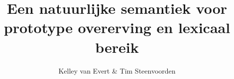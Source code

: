 \documentclass
  [11pt,a4paper,
   twoside=true,
   parskip=half,
   bibliography=totoc]
  {scrbook}
\newcommand{\<}
  {\langle}
\renewcommand{\>}
  {\rangle}
\begin{document}
\frenchspacing%
\raggedbottom%

\title{Een natuurlijke semantiek voor prototype overerving en lexicaal bereik}
\author{Kelley van Evert \& Tim Steenvoorden}
\maketitle

\frontmatter

\tableofcontents


\mainmatter





%

\backmatter

\raggedright
\nocite{nielsennielsen}

\end{document}
